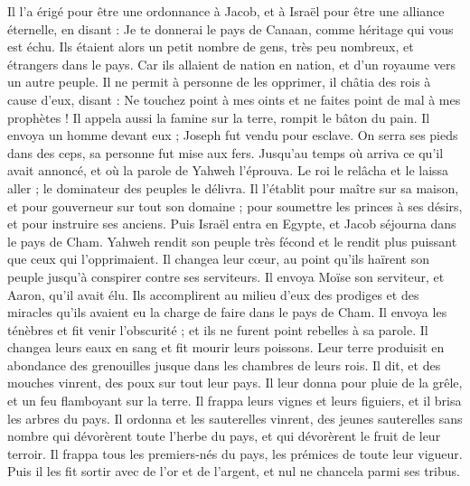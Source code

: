 \begin{multicols}{2}
Il l'a érigé pour être une ordonnance à Jacob, et à Israël pour être une alliance éternelle,
en disant : Je te donnerai le pays de Canaan, comme héritage qui vous est échu.
Ils étaient alors un petit nombre de gens, très peu nombreux, et étrangers dans le pays.
Car ils allaient de nation en nation, et d'un royaume vers un autre peuple.
Il ne permit à personne de les opprimer, il châtia des rois à cause d'eux,
disant : Ne touchez point à mes oints et ne faites point de mal à mes prophètes !
Il appela aussi la famine sur la terre, rompit le bâton du pain.
Il envoya un homme devant eux ; Joseph fut vendu pour esclave.
On serra ses pieds dans des ceps, sa personne fut mise aux fers.
Jusqu'au temps où arriva ce qu'il avait annoncé, et où la parole de Yahweh l'éprouva.
Le roi le relâcha et le laissa aller ; le dominateur des peuples le délivra.
Il l'établit pour maître sur sa maison, et pour gouverneur sur tout son domaine ;
pour soumettre les princes à ses désirs, et pour instruire ses anciens.
Puis Israël entra en Egypte, et Jacob séjourna dans le pays de Cham.
Yahweh rendit son peuple très fécond et le rendit plus puissant que ceux qui l'opprimaient.
Il changea leur cœur, au point qu'ils haïrent son peuple jusqu'à conspirer contre ses serviteurs.
Il envoya Moïse son serviteur, et Aaron, qu'il avait élu.
Ils accomplirent au milieu d'eux des prodiges et des miracles qu'ils avaient eu la charge de faire dans le pays de Cham.
Il envoya les ténèbres et fit venir l'obscurité ; et ils ne furent point rebelles à sa parole.
Il changea leurs eaux en sang et fit mourir leurs poissons.
Leur terre produisit en abondance des grenouilles jusque dans les chambres de leurs rois.
Il dit, et des mouches vinrent, des poux sur tout leur pays.
Il leur donna pour pluie de la grêle, et un feu flamboyant sur la terre.
Il frappa leurs vignes et leurs figuiers, et il brisa les arbres du pays.
Il ordonna et les sauterelles vinrent, des jeunes sauterelles sans nombre
qui dévorèrent toute l'herbe du pays, et qui dévorèrent le fruit de leur terroir.
Il frappa tous les premiers-nés du pays, les prémices de toute leur vigueur.
Puis il les fit sortir avec de l'or et de l'argent, et nul ne chancela parmi ses tribus.

\end{multicols}
